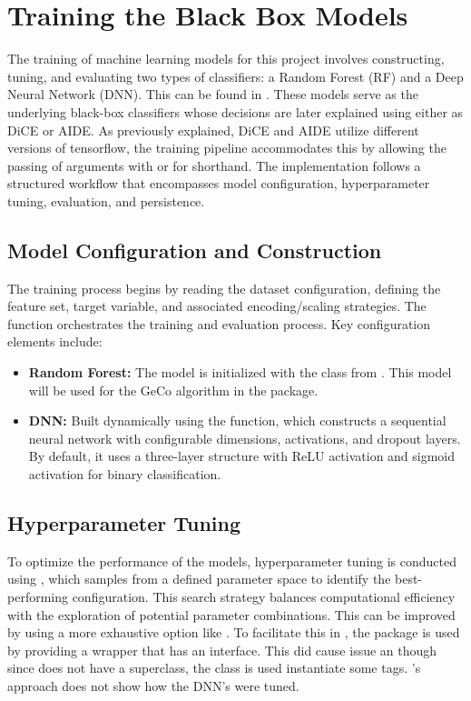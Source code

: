\section{Training the Black Box Models}
The training of machine learning models for this project involves constructing, tuning, and evaluating two types of classifiers: a Random Forest (RF) and a Deep Neural Network (DNN). This can be found in . These models serve as the underlying black-box classifiers whose decisions are later explained using either as DiCE or AIDE. 
As previously explained, DiCE and AIDE utilize different versions of tensorflow, the training pipeline accommodates this by allowing the passing of arguments with  or  for shorthand. The implementation follows a structured workflow that encompasses model configuration, hyperparameter tuning, evaluation, and persistence.

\subsection{Model Configuration and Construction} The training process begins by reading the dataset configuration, defining the feature set, target variable, and associated encoding/scaling strategies. The  function orchestrates the training and evaluation process. Key configuration elements include: 

\begin{itemize} \item \textbf{Random Forest:} The model is initialized with the  class from . This model will be used for the GeCo algorithm in the  package.
\item \textbf{DNN:} Built dynamically using the  function, which constructs a sequential neural network with configurable dimensions, activations, and dropout layers. By default, it uses a three-layer structure with ReLU activation and sigmoid activation for binary classification.
\end{itemize}

\subsection{Hyperparameter Tuning} To optimize the performance of the models, hyperparameter tuning is conducted using , which samples from a defined parameter space to identify the best-performing configuration. This search strategy balances computational efficiency with the exploration of potential parameter combinations. This can be improved by using a more exhaustive option like . To facilitate this in , the  package is used by providing a wrapper that has an  interface. This did cause issue an though since  does not have a superclass, the  class is used instantiate some tags. \citet{guidotti2024counterfactual}'s approach does not show how the DNN's were tuned.

